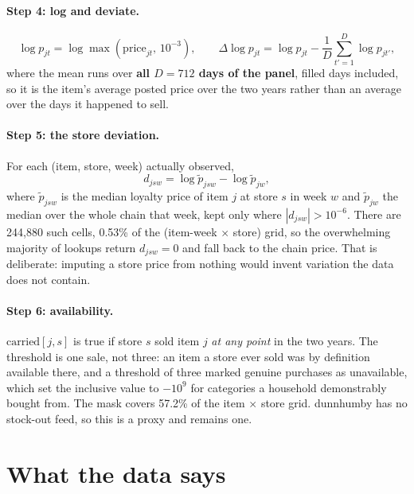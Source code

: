 \documentclass[11pt]{article}
\begin{document}
\paragraph{Step 4: log and deviate.}
\begin{equation}
\log p_{jt} = \log\max(\mathrm{price}_{jt},\,10^{-3}),
\qquad
\Delta\log p_{jt} = \log p_{jt} - \frac{1}{D}\sum_{t'=1}^{D}\log p_{jt'},
\end{equation}
where the mean runs over \textbf{all $D=712$ days of the panel}, filled days included,
so it is the item's average posted price over the two years rather than an average over
the days it happened to sell.

\paragraph{Step 5: the store deviation.} For each (item, store, week) actually observed,
\begin{equation}
d_{jsw} = \log \tilde p_{jsw} - \log \tilde p_{jw},
\end{equation}
where $\tilde p_{jsw}$ is the median loyalty price of item $j$ at store $s$ in week $w$
and $\tilde p_{jw}$ the median over the whole chain that week, kept only where
$|d_{jsw}|>10^{-6}$. There are 244,880 such cells, 0.53\% of the
(item-week $\times$ store) grid, so the overwhelming majority of lookups return
$d_{jsw}=0$ and fall back to the chain price. That is deliberate: imputing a store price
from nothing would invent variation the data does not contain.

\paragraph{Step 6: availability.} $\mathrm{carried}[j,s]$ is true if store $s$ sold item
$j$ \emph{at any point} in the two years. The threshold is one sale, not three: an item a
store ever sold was by definition available there, and a threshold of three marked
genuine purchases as unavailable, which set the inclusive value to $-10^9$ for categories
a household demonstrably bought from. The mask covers 57.2\% of the item $\times$ store
grid. dunnhumby has no stock-out feed, so this is a proxy and remains one.

\section{What the data says}
\label{sec:eda}
\end{document}
